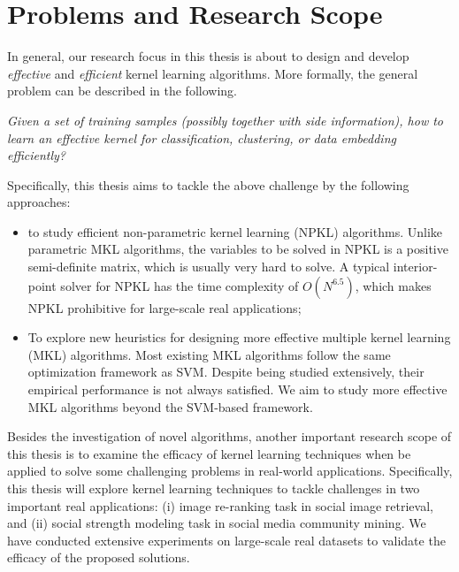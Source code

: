 \section{Problems and Research Scope}

In general, our research focus in this thesis is about to design and develop {\em effective} and {\em efficient} kernel learning algorithms. More formally, the general problem can be described in the following.

{\em Given a set of training samples (possibly together with side information), how to learn an effective kernel for classification, clustering, or data embedding efficiently?
}

Specifically, this thesis aims to tackle the above  challenge by the following approaches:
\begin{itemize}
  \item to study efficient non-parametric kernel learning (NPKL) algorithms. Unlike parametric MKL algorithms, the variables to be solved in NPKL is a positive semi-definite matrix, which is usually very hard to solve. A typical interior-point solver for NPKL has the time complexity of $O(N^{6.5})$, which makes NPKL prohibitive for large-scale real applications;
  \item To explore new heuristics for designing more effective multiple kernel learning (MKL) algorithms. Most existing MKL algorithms follow the same optimization framework as SVM. Despite being studied extensively, their empirical performance is not always satisfied. We aim to study more effective MKL algorithms beyond the SVM-based framework.
\end{itemize}

Besides the investigation of novel algorithms, another important research scope of this thesis is to examine the efficacy of kernel learning techniques when be applied to solve some challenging problems in real-world applications. Specifically, this thesis will explore kernel learning techniques to tackle challenges in two important real applications: (i) image re-ranking task in social image retrieval, and (ii) social strength modeling task in social media community mining. We have conducted extensive experiments on large-scale real datasets to validate the efficacy of the proposed solutions.



